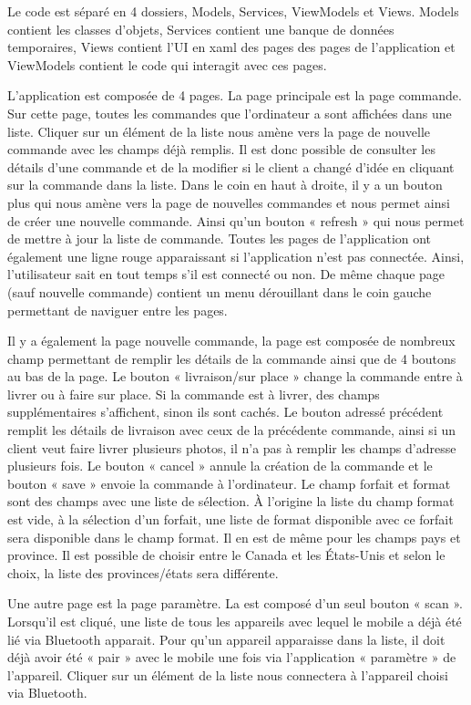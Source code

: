 \documentclass[12pt,fleqn]{article}
\begin{document}
Le code est séparé en 4 dossiers, Models, Services, ViewModels et Views. Models contient les classes d’objets, Services contient une banque de données temporaires, Views contient l’UI en xaml des pages des pages de l’application et ViewModels contient le code qui interagit avec ces pages.

L’application est composée de 4 pages. La page principale est la page commande. Sur cette page, toutes les commandes que l’ordinateur a sont affichées dans une liste. Cliquer sur un élément de la liste nous amène vers la page de nouvelle commande avec les champs déjà remplis. Il est donc possible de consulter les détails d’une commande et de la modifier si le client a changé d’idée en cliquant sur la commande dans la liste. Dans le coin en haut à droite, il y a un bouton plus qui nous amène vers la page de nouvelles commandes et nous permet ainsi de créer une nouvelle commande. Ainsi qu’un bouton « refresh » qui nous permet de mettre à jour la liste de commande. Toutes les pages de l’application ont également une ligne rouge apparaissant si l’application n’est pas connectée. Ainsi, l’utilisateur sait en tout temps s’il est connecté ou non. De même chaque page (sauf nouvelle commande) contient un menu dérouillant dans le coin gauche permettant de naviguer entre les pages.

Il y a également la page nouvelle commande, la page est composée de nombreux champ permettant de remplir les détails de la commande ainsi que de 4 boutons au bas de la page. Le bouton « livraison/sur place » change la commande entre à livrer ou à faire sur place. Si la commande est à livrer, des champs supplémentaires s’affichent, sinon ils sont cachés. Le bouton adressé précédent remplit les détails de livraison avec ceux de la précédente commande, ainsi si un client veut faire livrer plusieurs photos, il n’a pas à remplir les champs d’adresse plusieurs fois. Le bouton « cancel » annule la création de la commande et le bouton « save » envoie la commande à l’ordinateur. Le champ forfait et format sont des champs avec une liste de sélection. À l’origine la liste du champ format est vide, à la sélection d’un forfait, une liste de format disponible avec ce forfait sera disponible dans le champ format. Il en est de même pour les champs pays et province. Il est possible de choisir entre le Canada et les États-Unis et selon le choix, la liste des provinces/états sera différente.

Une autre page est la page paramètre. La est composé d’un seul bouton « scan ». Lorsqu’il est cliqué, une liste de tous les appareils avec lequel le mobile a déjà été lié via Bluetooth apparait. Pour qu’un appareil apparaisse dans la liste, il doit déjà avoir été « pair » avec le mobile une fois via l’application « paramètre » de l’appareil. Cliquer sur un élément de la liste nous connectera à l’appareil choisi via Bluetooth.
\end{document}
